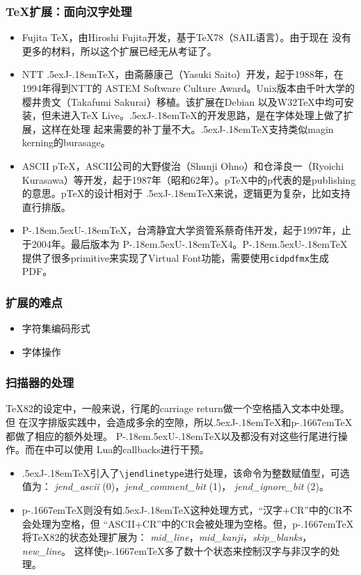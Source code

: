 \documentclass[dvipdfmx]{beamer}
\newcommand{\pTeX}{p\kern-.1667em\TeX}
\newcommand{\JTeX}{\leavevmode\hbox{\lower.5ex\hbox{J}\kern-.18em\TeX}}
\newcommand{\PUTeX}{\leavevmode\hbox{P\kern-.18em\lower.5ex\hbox{U}\kern-.18em\TeX}}
\begin{document}
\begin{frame}[fragile]
\frametitle{\TeX 扩展：面向汉字处理}
\begin{itemize}
\item Fujita \TeX ，由Hiroshi Fujita开发，基于\TeX78（SAIL语言）。由于现在
没有更多的材料，所以这个扩展已经无从考证了。
\item NTT \JTeX ，由斋藤康己（Yasuki Saito）开发，起于1988年，在1994年得到NTT的
ASTEM Software Culture Award。Unix版本由千叶大学的樱井贵文（Takafumi Sakurai）移植。该扩展在Debian
以及W32\TeX 中均可安装，但未进入\TeX{} Live。\JTeX 的开发思路，是在字体处理上做了扩展，这样在处理
起来需要的补丁量不大。\JTeX 支持类似magin kerning的burasage。
\item ASCII p\TeX ，ASCII公司的大野俊治（Shunji Ohno）和仓泽良一（Ryoichi
Kurasawa）等开发，起于1987年（昭和62年）。p\TeX 中的p代表的是publishing的意思。p\TeX 的设计相对于
\JTeX 来说，逻辑更为复杂，比如支持直行排版。
\item \PUTeX ，台湾静宜大学资管系蔡奇伟开发，起于1997年，止于2004年。最后版本为
\PUTeX4。\PUTeX 提供了很多primitive来实现了Virtual Font功能，需要使用\texttt{cidpdfmx}生成PDF。
\end{itemize}
\end{frame}
%
\begin{frame}[fragile]
\frametitle{扩展的难点}
\begin{itemize}
\item 字符集编码形式
\item 字体操作
\end{itemize}
\end{frame}
%
\begin{frame}[fragile]
\frametitle{扫描器的处理}
\TeX82的设定中，一般来说，行尾的carriage return做一个空格插入文本中处理。但
在汉字排版实践中，会造成多余的空隙，所以\JTeX 和\pTeX 都做了相应的额外处理。
\PUTeX 以及都没有对这些行尾进行操作。而在中可以使用
Lua的callbacks进行干预。

\begin{itemize}
\item \JTeX 引入了\verb!\jendlinetype!进行处理，该命令为整数赋值型，可选值为：
\textit{jend\_ascii} (0)，\textit{jend\_comment\_bit} (1)，
\textit{jend\_ignore\_bit} (2)。

\item \pTeX 则没有如\JTeX 这种处理方式，“汉字+CR”中的CR不会处理为空格，但
“ASCII+CR”中的CR会被处理为空格。但，\pTeX 将\TeX82的状态处理扩展为：
\textit{mid\_line}，\textit{mid\_kanji}，\textit{skip\_blanks}，\textit{new\_line}。
这样使\pTeX 多了数十个状态来控制汉字与非汉字的处理。
\end{itemize}
\end{frame}
\end{document}
